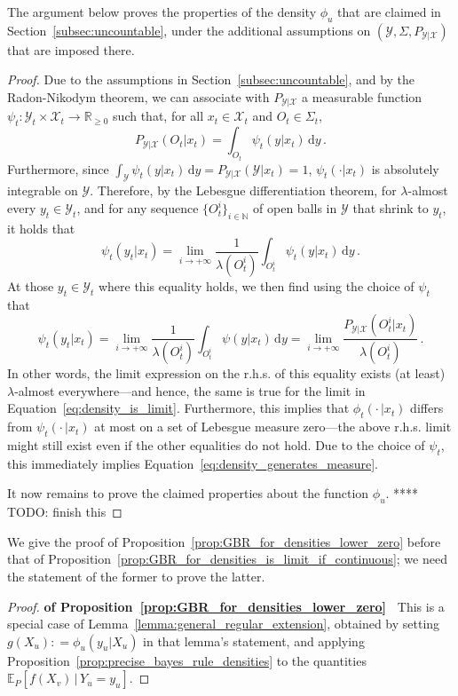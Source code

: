 \documentclass[twoside,11pt]{article}
\newcommand{\nats}{\mathbb{N}}
\newcommand{\reals}{\mathbb{R}}
\newcommand{\realsnonneg}{\reals_{\geq 0}}
\newcommand{\states}{\mathcal{X}}
\newcommand{\observs}{\mathcal{Y}}
\newcommand{\coloneqq}{:\!=}
\begin{document}
The argument below proves the properties of the density $\phi_u$ that are claimed in Section~\ref{subsec:uncountable}, under the additional assumptions on $(\observs,\Sigma,P_{\observs\vert\states})$ that are imposed there.

\begin{proof}
Due to the assumptions in Section~\ref{subsec:uncountable}, and by the Radon-Nikodym theorem, we can associate with $P_{\observs\vert\states}$ a measurable function $\psi_t:\observs_t\times\states_t\to\realsnonneg$ such that, for all $x_t\in\states_t$ and $O_t\in\Sigma_t$,
\begin{equation*}
P_{\observs\vert\states}(O_t\vert x_t) = \int_{O_t}\psi_t(y\vert x_t) \,\mathrm{d}y\,.
\end{equation*}
Furthermore, since $\int_{\observs}\psi_t(y\vert x_t) \,\mathrm{d}y = P_{\observs\vert\states}(\observs\vert x_t)=1$, $\psi_t(\cdot\vert x_t)$ is absolutely integrable on $\observs$. Therefore, by the Lebesgue differentiation theorem, for $\lambda$-almost every $y_t\in\observs_t$, and for any sequence $\{O_t^i\}_{i\in\nats}$ of open balls in $\observs$ that shrink to $y_t$, it holds that
\begin{equation*}
\psi_t(y_t\vert x_t) = \lim_{i\to+\infty} \frac{1}{\lambda(O_t^i)} \int_{O_t^i} \psi_t(y\vert x_t)\,\mathrm{d}y\,.
\end{equation*}
At those $y_t\in\observs_t$ where this equality holds, we then find using the choice of $\psi_t$ that
\begin{equation*}
\psi_t(y_t\vert x_t) = \lim_{i\to+\infty} \frac{1}{\lambda(O_t^i)} \int_{O_t^i} \psi(y\vert x_t)\,\mathrm{d}y = \lim_{i\to+\infty} \frac{P_{\observs\vert\states}(O_t^i\vert x_t)}{\lambda(O_t^i)}\,.
\end{equation*}
In other words, the limit expression on the r.h.s. of this equality exists (at least) $\lambda$-almost everywhere---and hence, the same is true for the limit in Equation~\eqref{eq:density_is_limit}. Furthermore, this implies that $\phi_t(\cdot\,\vert x_t)$ differs from $\psi_t(\cdot\,\vert x_t)$ at most on a set of Lebesgue measure zero---the above r.h.s. limit might still exist even if the other equalities do not hold. Due to the choice of $\psi_t$, this immediately implies Equation~\eqref{eq:density_generates_measure}.

It now remains to prove the claimed properties about the function $\phi_u$. **** TODO: finish this
\end{proof}

We give the proof of Proposition~\ref{prop:GBR_for_densities_lower_zero} before that of Proposition~\ref{prop:GBR_for_densities_is_limit_if_continuous}; we need the statement of the former to prove the latter.
\begin{proof}{\bf of Proposition~\ref{prop:GBR_for_densities_lower_zero}~}
This is a special case of Lemma~\ref{lemma:general_regular_extension}, obtained by setting $g(X_u)\coloneqq \phi_u(y_u\vert X_u)$ in that lemma's statement, and applying Proposition~\ref{prop:precise_bayes_rule_densities} to the quantities $\mathbb{E}_P[f(X_v)\,\vert\,Y_u=y_u]$.
\end{proof}
\end{document}
